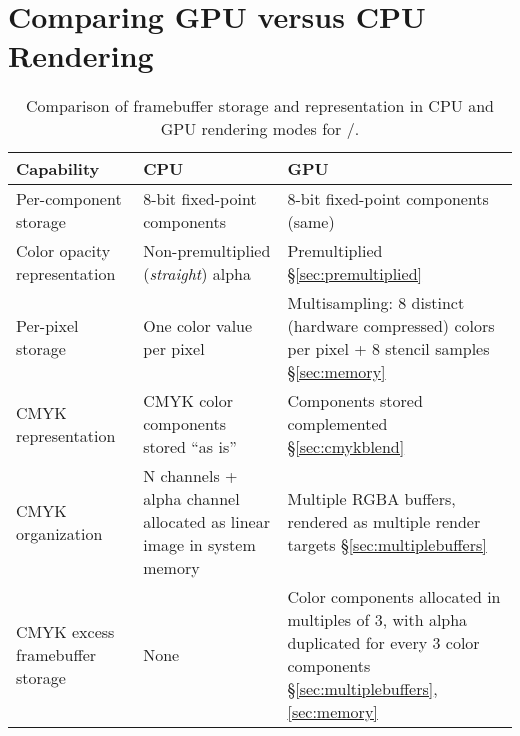 \section{Comparing GPU versus CPU Rendering}
\label{sec:comparison}


\begin{table*}
\centering
    \begin{tabular}{| E{1.4in} | L{2.3in} | L{2.6in} |} 
\hline
{\bf Capability} & {\bf CPU} & {\bf GPU} \\
\hline \hline

Per-component storage & 8-bit fixed-point components & 8-bit fixed-point components (same) \\
\hline

Color opacity representation & Non-premultiplied ({\em straight}) alpha & Premultiplied \S\ref{sec:premultiplied} \\
\hline

Per-pixel storage & One color value per pixel & Multisampling: 8 distinct (hardware compressed) colors per pixel + 8 stencil samples \S\ref{sec:memory} \\
\hline

CMYK representation & CMYK color components stored ``as is'' & Components stored complemented \S\ref{sec:cmykblend} \\
\hline

CMYK organization & N channels + alpha channel allocated as linear image in system memory & Multiple RGBA buffers, rendered as multiple render targets \S\ref{sec:multiplebuffers} \\
\hline

CMYK excess framebuffer \newline storage & None & Color components allocated in multiples of 3, with alpha duplicated for every 3 color components \S\ref{sec:multiplebuffers},\ref{sec:memory} \\
\hline

    \end{tabular}

\caption{Comparison of framebuffer storage and representation in CPU and GPU rendering modes for \Illustrator/.}
\label{table:framebuffer-compare}

\end{table*}

